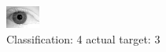 \begin{figure}[h!]
\begin{center}
\includegraphics[width=0.60\columnwidth]{figures/ID2211_class_4_target_3.png}
\end{center}
\caption{ Classification: 4 actual target: 3}
\label{fig:ID2211_class_4_target_3}
\end{figure}
